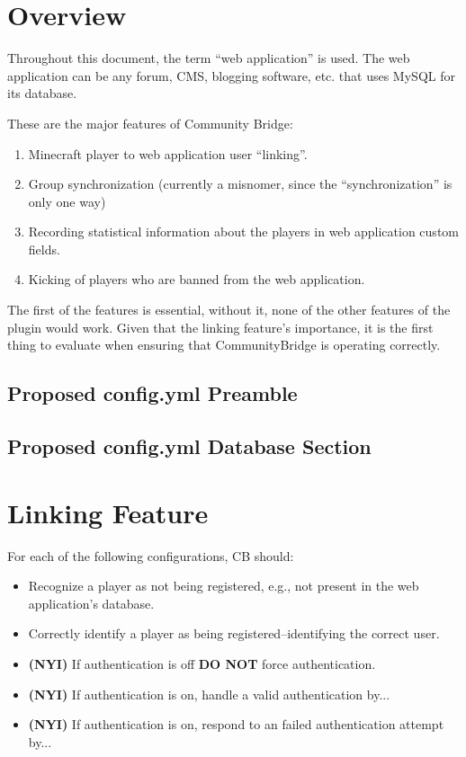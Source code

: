 \documentclass[letterpaper,12pt]{article}
\begin{document}
  \section{Overview}
  Throughout this document, the term ``web application'' is used. The web
  application can be any forum, CMS, blogging software, etc. that uses MySQL for
  its database.
  
  These are the major features of Community Bridge:
  \begin{enumerate}
    \item Minecraft player to web application user ``linking''.
    \item Group synchronization (currently a misnomer, since the
          ``synchronization'' is only one way)
    \item Recording statistical information about the players in web
          application custom fields.
    \item Kicking of players who are banned from the web application.
  \end{enumerate}
  
  The first of the features is essential, without it, none of the other
  features of the plugin would work. Given that the linking feature's
  importance, it is the first thing to evaluate when ensuring that
  CommunityBridge is operating correctly.

  \clearpage
  \subsection{Proposed config.yml Preamble}
  

  \clearpage
  \subsection{Proposed config.yml Database Section}
  

  \clearpage
  \section{Linking Feature}
  For each of the following configurations, CB should:
  \begin{itemize}
    \item Recognize a player as not being registered, e.g., not present in the
    web application's database.
    \item Correctly identify a player as being registered--identifying the
    correct user.
    \item {\bf (NYI)} If authentication is off {\bf DO NOT} force authentication.
    \item {\bf (NYI)} If authentication is on, handle a valid authentication by...
    \item {\bf (NYI)} If authentication is on, respond to an failed authentication attempt by...
  \end{itemize}
\end{document}
